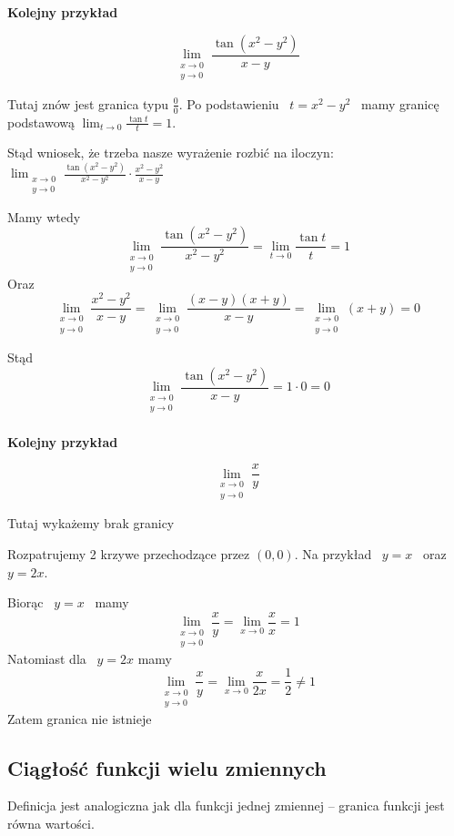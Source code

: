 \textbf{Kolejny przykład}

$$ \lim_{\substack{x \to 0 \\ y \to 0}} \frac{\tan (x^2 - y^2)}{x - y} $$

Tutaj znów jest granica typu $ \frac{0}{0} $. Po podstawieniu \ $ t = x^2 - y^2 $ \ mamy granicę podstawową
$ \lim_{t \to 0} \frac{\tan t}{t} = 1 $.

Stąd wniosek, że trzeba nasze wyrażenie rozbić na iloczyn: 
$ \lim_{\substack{x \to 0 \\ y \to 0}} \frac{\tan (x^2 - y^2)}{x^2 - y^2} \cdot \frac{x^2 - y^2}{x - y} $

Mamy wtedy
$$ \lim_{\substack{x \to 0 \\ y \to 0}} \frac{\tan (x^2 - y^2)}{x^2 - y^2} = \lim_{t \to 0} \frac{\tan t}{t} = 1 $$
Oraz
$$ \lim_{\substack{x \to 0 \\ y \to 0}} \frac{x^2 - y^2}{x - y} = \lim_{\substack{x \to 0 \\ y \to 0}} \frac{(x - y)(x + y)}{x - y}
= \lim_{\substack{x \to 0 \\ y \to 0}} (x + y) = 0 $$

Stąd 
$$ \lim_{\substack{x \to 0 \\ y \to 0}} \frac{\tan (x^2 - y^2)}{x - y} = 1 \cdot 0 = 0 $$ \\

\textbf{Kolejny przykład}

$$ \lim_{\substack{x \to 0 \\ y \to 0}} \frac{x}{y} $$

Tutaj wykażemy brak granicy

Rozpatrujemy 2 krzywe przechodzące przez $(0,0)$. Na przykład \ $ y = x $ \ oraz \ $ y = 2x $.

Biorąc \ $ y = x $ \ mamy
$$ \lim_{\substack{x \to 0 \\ y \to 0}} \frac{x}{y} = \lim_{x \to 0} \frac{x}{x} = 1 $$
Natomiast dla \ $ y = 2x $ mamy
$$ \lim_{\substack{x \to 0 \\ y \to 0}} \frac{x}{y} = \lim_{x \to 0} \frac{x}{2x} = \frac{1}{2} \neq 1 $$
Zatem granica nie istnieje \\

\subsection*{Ciągłość funkcji wielu zmiennych}

Definicja jest analogiczna jak dla funkcji jednej zmiennej -- granica funkcji jest równa wartości.

